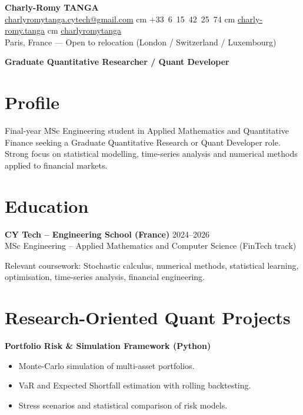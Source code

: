 \documentclass[10pt, letterpaper]{article}
\begin{document}
\begin{center}
    \textbf{\LARGE Charly-Romy TANGA} \\[0.2cm]
    \mbox{\href{mailto:charlyromytanga.cytech@gmail.com}{\footnotesize\faEnvelope\hspace*{0.1cm}charlyromytanga.cytech@gmail.com}}
     cm
    \mbox{\faPhone\hspace*{0.1cm}+33 6 15 42 25 74}
     cm
    \mbox{\href{https://www.linkedin.com/in/charly-romy-tanga}{\footnotesize\faLinkedin\hspace*{0.1cm}charly-romy.tanga}}
     cm
    \mbox{\href{https://github.com/charlyromytanga}{\footnotesize\faGithub\hspace*{0.1cm}charlyromytanga}}
    \\[0.2cm]
    Paris, France --- Open to relocation (London / Switzerland / Luxembourg)
\end{center}

\vspace{0.2cm}
\textbf{Graduate Quantitative Researcher / Quant Developer}

\section*{Profile}
Final-year MSc Engineering student in Applied Mathematics and Quantitative Finance seeking a Graduate Quantitative Research or Quant Developer role. Strong focus on statistical modelling, time-series analysis and numerical methods applied to financial markets.

\section*{Education}
\textbf{CY Tech -- Engineering School (France)} \hfill 2024--2026\\
MSc Engineering -- Applied Mathematics and Computer Science (FinTech track)

Relevant coursework: Stochastic calculus, numerical methods, statistical learning, optimisation, time-series analysis, financial engineering.

\section*{Research-Oriented Quant Projects}
\textbf{Portfolio Risk \& Simulation Framework (Python)}
\begin{itemize}[leftmargin=0.5cm]
\item Monte-Carlo simulation of multi-asset portfolios.
\item VaR and Expected Shortfall estimation with rolling backtesting.
\item Stress scenarios and statistical comparison of risk models.
\end{itemize}
\end{document}
